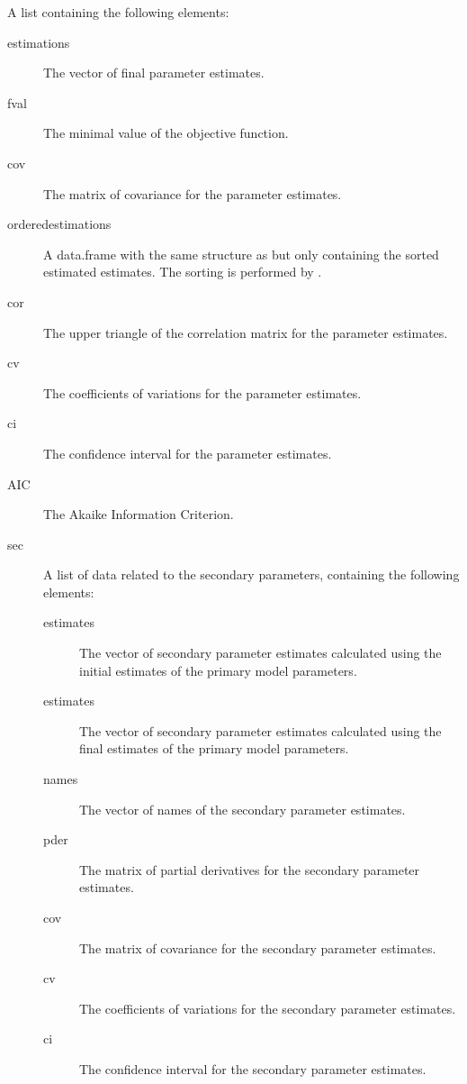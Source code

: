 \begin{Arguments}
\begin{ldescription}
\item[\code{Fit}] A list containing the following elements:\begin{description}

\item[estimations] The vector of final parameter estimates.
\item[fval] The minimal value of the objective function.
\item[cov] The matrix of covariance for the parameter estimates.
\item[orderedestimations] A data.frame with the same structure as
 but only containing the sorted estimated estimates.
The sorting is performed by .
\item[cor] The upper triangle of the correlation matrix for the parameter
estimates.
\item[cv] The coefficients of variations for the parameter estimates.
\item[ci] The confidence interval for the parameter estimates.
\item[AIC] The Akaike Information Criterion.
\item[sec] A list of data related to the secondary parameters, containing
the following elements:\begin{description}

\item[estimates] The vector of secondary parameter estimates calculated
using the initial estimates of the primary model parameters.
\item[estimates] The vector of secondary parameter estimates calculated
using the final estimates of the primary model parameters.
\item[names] The vector of names of the secondary parameter estimates.
\item[pder] The matrix of partial derivatives for the secondary
parameter estimates.
\item[cov] The matrix of covariance for the secondary parameter
estimates.
\item[cv] The coefficients of variations for the secondary parameter
estimates.
\item[ci] The confidence interval for the secondary parameter
estimates.

\end{description}



\end{description}



\end{ldescription}
\end{Arguments}
